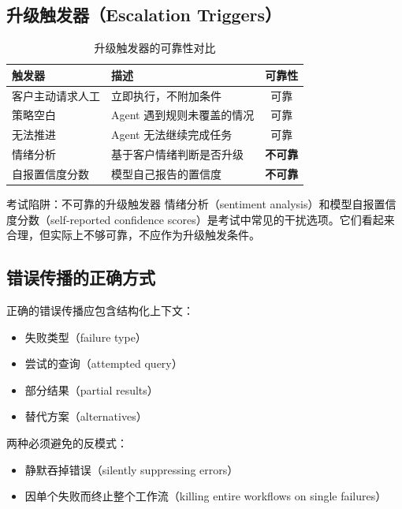 \documentclass[a4paper]{article}
\begin{document}
\subsection{升级触发器（Escalation Triggers）}

\begin{table}[H]
\centering
\begin{tabular}{lp{7cm}c}
\toprule
\textbf{触发器} & \textbf{描述} & \textbf{可靠性} \\
\midrule
客户主动请求人工 & 立即执行，不附加条件 & 可靠 \\
策略空白 & Agent 遇到规则未覆盖的情况 & 可靠 \\
无法推进 & Agent 无法继续完成任务 & 可靠 \\
\midrule
情绪分析 & 基于客户情绪判断是否升级 & \textbf{不可靠} \\
自报置信度分数 & 模型自己报告的置信度 & \textbf{不可靠} \\
\bottomrule
\end{tabular}
\caption{升级触发器的可靠性对比}
\end{table}

\begin{warningbox}{考试陷阱：不可靠的升级触发器}
情绪分析（sentiment analysis）和模型自报置信度分数（self-reported confidence scores）是考试中常见的干扰选项。它们看起来合理，但实际上不够可靠，不应作为升级触发条件。
\end{warningbox}

\subsection{错误传播的正确方式}

正确的错误传播应包含结构化上下文：
\begin{itemize}[leftmargin=1.5em]
    \item 失败类型（failure type）
    \item 尝试的查询（attempted query）
    \item 部分结果（partial results）
    \item 替代方案（alternatives）
\end{itemize}

两种必须避免的反模式：
\begin{itemize}[leftmargin=1.5em]
    \item 静默吞掉错误（silently suppressing errors）
    \item 因单个失败而终止整个工作流（killing entire workflows on single failures）
\end{itemize}
\end{document}
